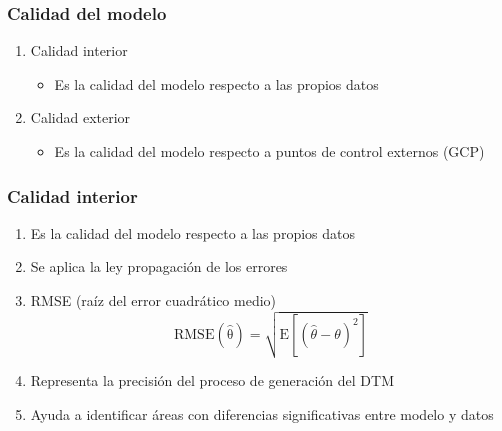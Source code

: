 \begin{frame}
  \frametitle{Calidad del modelo}
  \begin{enumerate}
    \item Calidad \alert{interior}
      \begin{itemize}
        \item Es la calidad del modelo respecto a las \alert{propios datos}
      \end{itemize}
    \item Calidad \alert{exterior}
      \begin{itemize}
        \item Es la calidad del modelo respecto a \alert{puntos de control
          externos (GCP)}
      \end{itemize}
  \end{enumerate}
\end{frame}
\begin{frame}
  \frametitle{Calidad interior}
  \begin{enumerate}
    \item Es la calidad del modelo respecto a las propios datos
    \item Se aplica la ley propagación de los errores
    \item \alert{RMSE} (raíz del error cuadrático medio)
      \[ \mathrm{RMSE(\widehat\theta)}=\sqrt{\mathrm{E}\left[(\widehat\theta - \theta)^2\right]}\]
    \item Representa la precisión del proceso de generación del DTM 
    \item Ayuda a identificar áreas con diferencias significativas entre
      modelo y datos
  \end{enumerate}
\end{frame}
